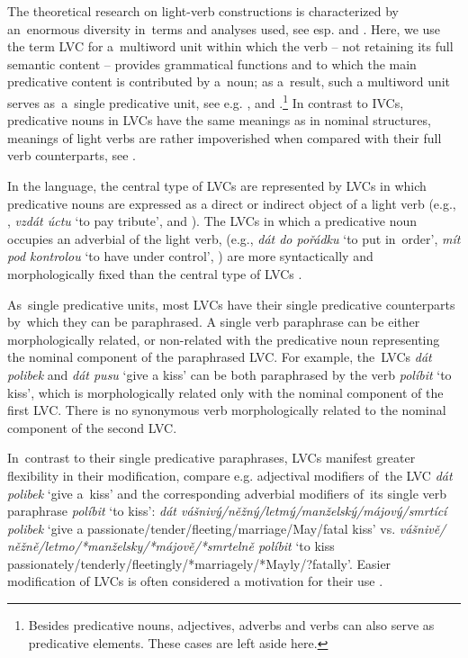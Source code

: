 \documentclass[output=paper,modfonts,nonflat]{langsci/langscibook}
\begin{document}
The theoretical research on light-verb constructions is characterized by 
an~enormous diversity in~terms and analyses used, see esp. \citet{amberber-10} 
and \citet{alsina-97}. Here, we use the term  LVC for a~multiword unit within 
which the verb -- not retaining its full semantic content -- provides 
grammatical functions and to which the main predicative content is contributed 
by a~noun; as a~result, such a multiword unit serves as~a~single predicative 
unit, see e.g. \citet{algeo-95}, \citet{alsina-97} and 
\citet{butt-2010}.\footnote{Besides predicative nouns, adjectives, adverbs and
verbs can also serve as predicative elements. These cases are left aside 
here.} In contrast to IVCs, predicative nouns in LVCs have the same meanings 
as in nominal structures, meanings of light verbs are rather impoverished when 
compared with their full verb counterparts, see . 

In the  language, the central type of LVCs are represented by LVCs in 
which predicative nouns are expressed as a direct or indirect object of a 
light verb (e.g., , 
\textit{vzdát úctu} `to pay tribute', and ). 
The LVCs in which a predicative noun occupies an adverbial of the light verb, 
(e.g., \textit{dát do pořádku} `to put in~order', \textit{mít pod kontrolou} 
`to have under control', ) are more syntactically and morphologically fixed than the 
central type of LVCs \citep{radimsky-10}.

As~single predicative units, most LVCs have their single predicative 
counterparts by~which they can be paraphrased. A single verb paraphrase can be
either morphologically related, or non-related with the predicative noun 
representing the nominal component of the paraphrased LVC. For example, the~LVCs 
\textit{dát polibek} and \textit{dát pusu} `give a kiss' can be both paraphrased 
by the verb \textit{políbit} `to kiss', which is morphologically related only 
with the nominal component of  the first LVC. There is no synonymous verb 
morphologically related to the nominal component of the second LVC.

In~contrast to their single predicative paraphrases, LVCs manifest greater 
flexibility in their modification, compare e.g. adjectival modifiers of~the LVC 
\textit{dát polibek} `give a~kiss' and the corresponding adverbial modifiers 
of~its single verb paraphrase \textit{políbit} `to kiss':  
\textit{dát váš\-ni\-vý/něž\-ný/let\-mý/man\-žel\-ský/má\-jo\-vý/smr\-tí\-cí 
po\-li\-bek} `give a pas\-sion\-ate/ten\-der/fleet\-ing/mar\-riage/May/fa\-tal 
kiss' vs. \textit{váš\-ni\-vě/ něž\-ně/let\-mo/*man\-žel\-sky/*má\-jo\-vě/*smr\-tel\-ně 
po\-lí\-bit} `to kiss pas\-sion\-ate\-ly/ten\-der\-ly/fleet\-ing\-ly/*mar\-riage\-ly/*May\-ly/?fa\-tal\-ly'.  Easier modification of LVCs is often considered a motivation for their use \citep{brinton-99}.
\end{document}
